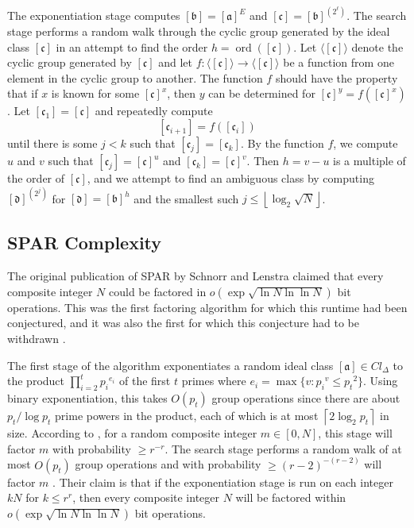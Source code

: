 \documentclass{ucalgthes1}
\theoremstyle{definition}
\DeclareMathOperator{\ord}{ord}
\newcommand{\floor}[1]{\left\lfloor #1 \right\rfloor}
\newcommand{\ceil}[1]{\left\lceil #1 \right\rceil}
\newcommand{\ideal}{\mathfrak}
\newcommand{\idealclass}[1]{\left[ \ideal #1 \right]}
\newcommand{\aclass}{\idealclass a}
\newcommand{\bclass}{\idealclass b}
\newcommand{\cclass}{\idealclass c}
\newcommand{\dclass}{\idealclass d}
\begin{document}
The exponentiation stage computes $\bclass = \aclass^E$ and $\cclass = \bclass^{\left(2^\ell\right)}$.  The search stage performs a random walk through the cyclic group generated by the ideal class $\cclass$ in an attempt to find the order $h = \ord(\cclass)$.  Let $\langle \cclass \rangle$ denote the cyclic group generated by $\cclass$ and let $f : \langle \cclass \rangle \rightarrow \langle \cclass \rangle$ be a function from one element in the cyclic group to another.  The function $f$ should have the property that if $x$ is known for some $\cclass ^x$, then $y$ can be determined for $\cclass^y = f(\cclass^x)$.  Let $[\mathfrak c_1] = \cclass$ and repeatedly compute
\[
	[\mathfrak c_{i+1}] = f([\mathfrak c_i])
\]
until there is some $j < k$ such that $[\mathfrak c_j] = [\mathfrak c_k]$.  By the function $f$, we compute $u$ and $v$ such that $[\mathfrak c_j]=\cclass^u$ and $[\mathfrak c_k]=\cclass^v$.  Then $h = v - u$ is a multiple of the order of $\cclass$, and we attempt to find an ambiguous class by computing $\dclass^{\left(2^j\right)}$ for $\dclass = \bclass^h$ and the smallest such $j \le \floor{\log_2{\sqrt N}}$.

\subsection{SPAR Complexity}


The original publication of SPAR by Schnorr and Lenstra \cite{Schnorr1984} claimed that every composite integer $N$ could be factored in $o\left(\exp\sqrt{\ln N \ln\ln N}\right)$ bit operations.  This was the first factoring algorithm for which this runtime had been conjectured, and it was also the first for which this conjecture had to be withdrawn \cite{Lenstra1992}.

The first stage of the algorithm exponentiates a random ideal class $\aclass \in Cl_\Delta$ to the product $\prod_{i=2}^t {p_i}^{e_i}$ of the first $t$ primes where $e_i = \max \{ v : {p_i}^v \le {p_t}^2 \}$.  Using binary exponentiation, this takes $O(p_t)$ group operations since there are about $p_t / \log p_t$ prime powers in the product, each of which is at most $\ceil{2 \log_2 p_t}$ in size. According to \cite[p.290]{Schnorr1984}, for a random composite integer $m \in [0, N]$, this stage will factor $m$ with probability $\ge r^{-r}$.  The search stage performs a random walk of at most $O(p_t)$ group operations and with probability $\ge (r-2)^{-(r-2)}$ will factor $m$ \cite[p.290]{Schnorr1984}.  Their claim is that if the exponentiation stage is run on each integer $kN$ for $k \le r^r$, then every composite integer $N$ will be factored within $o\left(\exp \sqrt{ \ln N \ln\ln N } \right)$ bit operations.
\end{document}
